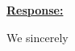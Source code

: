 \documentclass[a4paper,12pt]{article}
\begin{document}
\noindent \underline {\textbf{Response:}}
\bigskip

We sincerely

\end{document}
